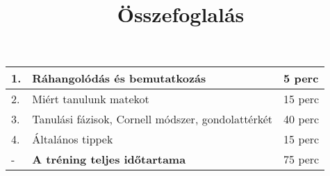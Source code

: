\documentclass[../Main.tex]{subfiles}
\begin{document}
\title{Összefoglalás}

\begin{center}
    \begin{tabular}{| m{1.3 em} | m{} | m{} |}
    \hline
    1. & Ráhangolódás és bemutatkozás & 5 perc \\
    \hline
    2. & Miért tanulunk matekot & 15 perc \\
    \hline
    3. & Tanulási fázisok, Cornell módszer, gondolattérkét & 40 perc \\
    \hline
    4. & Általános tippek & 15 perc \\
    \hline
    - & \textbf{A tréning teljes időtartama} & 75 perc \\
    \hline
    \end{tabular}
\end{center}
\end{document}
